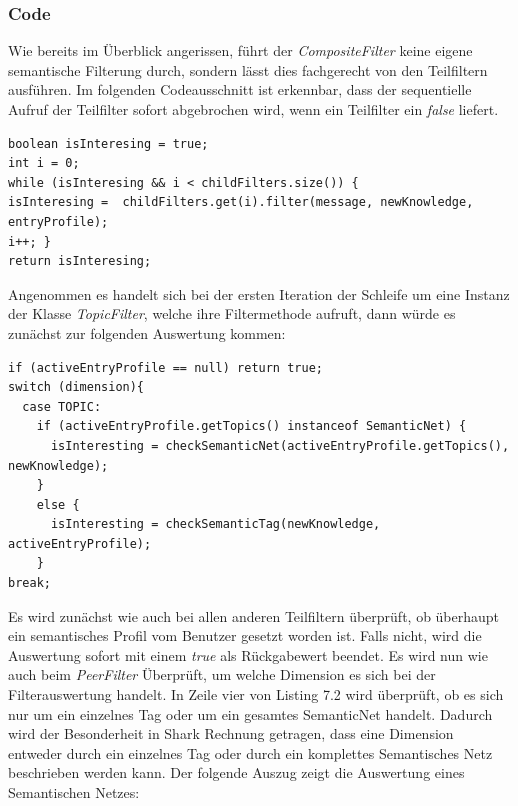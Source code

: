 \subsubsection{Code}
Wie bereits im Überblick angerissen, führt der \textit{CompositeFilter} keine eigene semantische Filterung durch, sondern lässt dies fachgerecht von den Teilfiltern ausführen. Im folgenden Codeausschnitt ist erkennbar, dass der sequentielle Aufruf der Teilfilter sofort abgebrochen wird, wenn ein Teilfilter ein \textit{false} liefert.
\lstset{language=Java, caption=Filtermethode im Kompositum, label=DescriptiveLabel, numbers=left, numbersep=1em, breaklines=true, basicstyle=\small}
\begin{lstlisting}
boolean isInteresing = true;
int i = 0;
while (isInteresing && i < childFilters.size()) {
isInteresing =  childFilters.get(i).filter(message, newKnowledge, entryProfile);
i++; }
return isInteresing;
\end{lstlisting}
Angenommen es handelt sich bei der ersten Iteration der Schleife um eine Instanz der Klasse \textit{TopicFilter}, welche ihre Filtermethode aufruft, dann würde es zunächst zur folgenden Auswertung kommen:
\lstset{language=Java, caption=Filtermethode des TopicType Filters (Auszug), label=DescriptiveLabel, numbers=left, numbersep=1em, breaklines=true, basicstyle=\small}
\begin{lstlisting}
if (activeEntryProfile == null) return true;
switch (dimension){
  case TOPIC:
    if (activeEntryProfile.getTopics() instanceof SemanticNet) {
	  isInteresting = checkSemanticNet(activeEntryProfile.getTopics(), newKnowledge);
	}
	else {
	  isInteresting = checkSemanticTag(newKnowledge, activeEntryProfile);
    }
break;
\end{lstlisting}
Es wird zunächst wie auch bei allen anderen Teilfiltern überprüft, ob überhaupt ein semantisches Profil vom Benutzer gesetzt worden ist. Falls nicht, wird die Auswertung sofort mit einem \textit{true} als Rückgabewert beendet. Es wird nun wie auch beim \textit{PeerFilter} Überprüft, um welche Dimension es sich bei der Filterauswertung handelt. In Zeile vier von Listing 7.2 wird überprüft, ob es sich nur um ein einzelnes Tag oder um ein gesamtes SemanticNet handelt. Dadurch wird der Besonderheit in Shark Rechnung getragen, dass eine Dimension entweder durch ein einzelnes Tag oder durch ein komplettes Semantisches Netz beschrieben werden kann. Der folgende Auszug zeigt die Auswertung eines Semantischen Netzes:
\lstset{language=Java, caption=Auswertung des Semantischen Netzes (Auszug), label=DescriptiveLabel, numbers=left, numbersep=1em, breaklines=true, basicstyle=\small}
